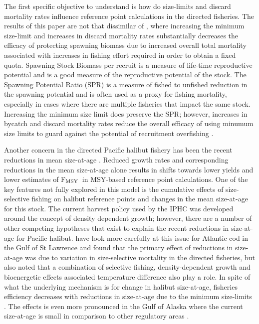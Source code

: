 \documentclass[12pt,leqno]{article}
\newcommand{\fmsy}{F$_{\textnormal{MSY}}$}
\begin{document}
The first specific objective to understand is how do size-limits and discard mortality rates influence reference point calculations in the directed fisheries.  The results of this paper are not that dissimilar of \cite{coggins2007ecm}, where increasing the minimum size-limit and increases in discard mortality rates substantially decreases the efficacy of protecting spawning biomass due to increased overall total mortality associated with increases in fishing effort required in order to obtain a fixed quota.  Spawning Stock Biomass per recruit is a measure of life-time reproductive potential and is a good measure of the reproductive potential of the stock.  The Spawning Potential Ratio (SPR) is a measure of fished to unfished reduction in the spawning potential and is often used as a proxy for fishing mortality, especially in cases where there are multiple fisheries that impact the same stock. Increasing the minimum size limit does preserve the SPR; however, increases in bycatch and discard mortality rates reduce the overall efficacy of using minumum size limits to guard against the potential of recruitment overfishing \citep{pineiii2008car}.

Another concern in the directed Pacific halibut fishery has been the recent reductions in mean size-at-age \citep{clark1999decadal,martell2013:ohr}.  Reduced growth rates and corresponding reductions in the mean size-at-age alone results in shifts towards lower yields and lower estimates of \fmsy\ in MSY-based reference point calculations.  One of the key features not fully explored in this model is the cumulative effects of size-selective fishing on halibut reference points and changes in the mean size-at-age for this stock.  The current harvest policy used by the IPHC was developed around the concept of density dependent growth; however, there are a number of other competing hypotheses that exist to explain the recent reductions in size-at-age for Pacific halibut.  \cite{sinclair2002disentangling} have look more carefully at this issue for Atlantic cod in the Gulf of St Lawrence and found that the primary effect of reductions in size-at-age was due to variation in size-selective mortality in the directed fisheries, but also noted that a combination of selective fishing, density-dependent growth and bioenergetic effects associated temperature difference also play a role.  In spite of what the underlying mechanism is for change in halibut size-at-age, fisheries efficiency decreases with reductions in size-at-age due to the minimum size-limits \citep{clark1995re}.  The effects is even more pronounced in the Gulf of Alaska where the current size-at-age is small in comparison to other regulatory areas \citep{Stewart2014}.
\end{document}
